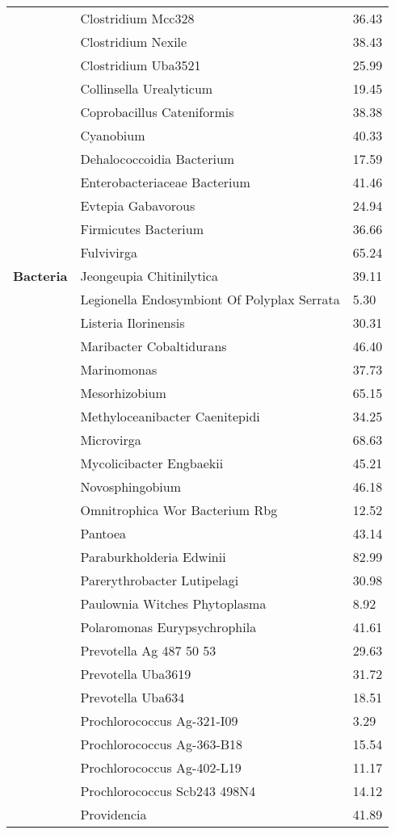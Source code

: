 \documentclass{article}
\begin{document}
\begin{longtable}{lll}
& Clostridium Mcc328 & 36.43 \\
& Clostridium Nexile & 38.43 \\
& Clostridium Uba3521 & 25.99 \\
& Collinsella Urealyticum & 19.45 \\
& Coprobacillus Cateniformis & 38.38 \\
& Cyanobium & 40.33 \\
& Dehalococcoidia Bacterium & 17.59 \\
& Enterobacteriaceae Bacterium & 41.46 \\
& Evtepia Gabavorous & 24.94 \\
& Firmicutes Bacterium & 36.66 \\
& Fulvivirga & 65.24 \\
\textbf{Bacteria} & Jeongeupia Chitinilytica & 39.11 \\
& Legionella Endosymbiont Of Polyplax Serrata & 5.30 \\
& Listeria Ilorinensis & 30.31 \\
& Maribacter Cobaltidurans & 46.40 \\
& Marinomonas & 37.73 \\
& Mesorhizobium & 65.15 \\
& Methyloceanibacter Caenitepidi & 34.25 \\
& Microvirga & 68.63 \\
& Mycolicibacter Engbaekii & 45.21 \\
& Novosphingobium & 46.18 \\
& Omnitrophica Wor Bacterium Rbg & 12.52 \\
& Pantoea & 43.14 \\
& Paraburkholderia Edwinii & 82.99 \\
& Parerythrobacter Lutipelagi & 30.98 \\
& Paulownia Witches Phytoplasma & 8.92 \\
& Polaromonas Eurypsychrophila & 41.61 \\
& Prevotella Ag 487 50 53 & 29.63 \\
& Prevotella Uba3619 & 31.72 \\
& Prevotella Uba634 & 18.51 \\
& Prochlorococcus Ag-321-I09 & 3.29 \\
& Prochlorococcus Ag-363-B18 & 15.54 \\
& Prochlorococcus Ag-402-L19 & 11.17 \\
& Prochlorococcus Scb243 498N4 & 14.12 \\
& Providencia & 41.89 \\

\end{longtable}
\end{document}
